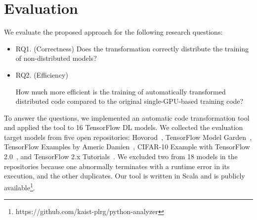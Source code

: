 \section{Evaluation}\label{sec:eval}
We evaluate the proposed approach for the following research questions:
\begin{itemize}
\item RQ1. (Correctness) Does the transformation correctly distribute the
  training of non-distributed models?
\item RQ2. (Efficiency) 
    \begin{inred}
        How much more efficient is the training of automatically transformed 
        distributed code compared to the original single-GPU-based training code?
    \end{inred}
\end{itemize}

\noindent
To answer the questions, we implemented an automatic code transformation tool
and applied the tool to 16 TensorFlow DL models.
We collected the evaluation target models from five open repositories: 
Hovorod~\cite{horovodgithub}, TensorFlow Model Garden~\cite{tfmodelgarden},
TensorFlow Examples by Americ Damien~\cite{tfexamplesdamien},
CIFAR-10 Example with TensorFlow 2.0~\cite{cifar10github}, and
TensorFlow 2.x Tutorials~\cite{tf2tutogithub}.
We excluded two from 18 models in the repositories because one abnormally
terminates with a runtime error in its execution, and the other duplicates.
Our tool is written in Scala and is publicly
available\footnote{https://github.com/kaist-plrg/python-analyzer}.

